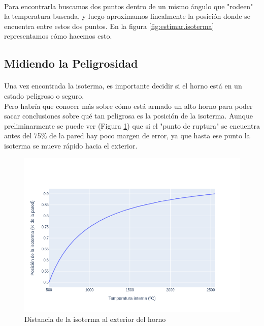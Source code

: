 \documentclass[12pt]{article}
\begin{document}
\paragraph{} Para encontrarla buscamos dos puntos dentro de un mismo ángulo que "rodeen" la temperatura buscada, y luego aproximamos linealmente la posición donde se encuentra entre estos dos puntos. En la figura \ref{fig:estimar.isoterma} representamos cómo hacemos esto.


\subsection{Midiendo la Peligrosidad}
\label{sec:peligrosidad.distance}

\paragraph{} Una vez encontrada la isoterma, es importante decidir si el horno está en un estado peligroso o seguro. \\
Pero habría que conocer más sobre cómo está armado un alto horno para poder sacar conclusiones sobre qué tan peligrosa es la posición de la isoterma. Aunque preliminarmente se puede ver (Figura \ref{fig:peligrosidad.distance}) que si el "punto de ruptura" se encuentra antes del 75\% de la pared hay poco margen de error, ya que hasta ese punto la isoterma se mueve rápido hacia el exterior.

\begin{figure}[H]
\centering
\includegraphics[scale=0.5]{peligrosidad}
\caption{Distancia de la isoterma al exterior del horno}
\label{fig:peligrosidad.distance}
\end{figure}
\end{document}
